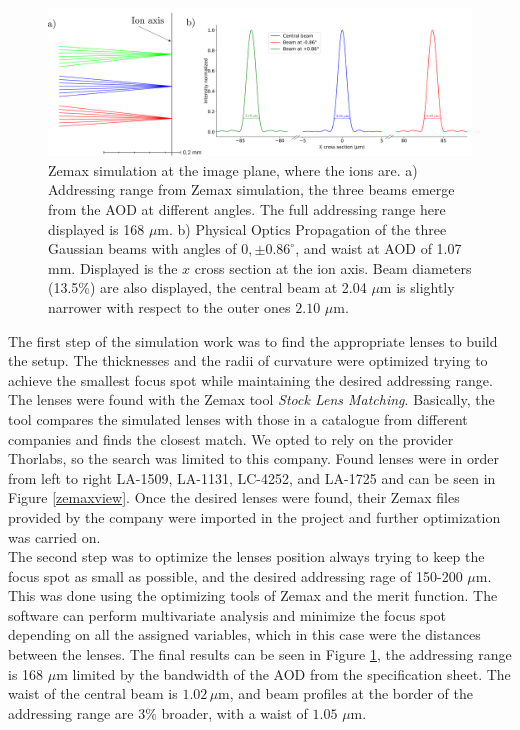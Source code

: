 \begin{figure}
     \centering
     \centering
     \includegraphics[width=1\textwidth]{img/range_plus_3beams}
     \caption{Zemax simulation at the image plane, where the ions are. a) Addressing range from Zemax simulation, the three beams emerge from the AOD at different angles. The full addressing range here displayed is 168 $\mu$m. b) Physical Optics Propagation of the three Gaussian beams with angles of $0,\pm0.86^\circ$, and waist at AOD of 1.07 mm. Displayed is the $x$ cross section at the ion axis. Beam diameters (13.5\%) are also displayed, the central beam at 2.04 $\mu$m is slightly narrower with respect to the outer ones $2.10$ $\mu$m.}
     \label{zemaxrange}
\end{figure}
The first step of the simulation work was to find the appropriate lenses to build the setup. The thicknesses and the radii of curvature were optimized trying to achieve the smallest focus spot while maintaining the desired addressing range. The lenses were found with the Zemax tool \emph{Stock Lens Matching}. Basically, the tool compares the simulated lenses with those in a catalogue from different companies and finds the closest match. We opted to rely on the provider Thorlabs, so the search was limited to this company. Found lenses were in order from left to right LA-1509, LA-1131, LC-4252, and LA-1725 and can be seen in Figure \ref{zemaxview}. Once the desired lenses were found, their Zemax files provided by the company were imported in the project and further optimization was carried on.\\
The second step was to optimize the lenses position always trying to keep the focus spot as small as possible, and the desired addressing rage of 150-200 $\mu$m. This was done using the optimizing tools of Zemax and the merit function. The software can perform multivariate analysis and minimize the focus spot depending on all the assigned variables, which in this case were the distances between the lenses. The final results can be seen in Figure \ref{zemaxrange}, the addressing range is 168 $\mu$m limited by the bandwidth of the AOD from the specification sheet. The waist of the central beam is $1.02\,\mu$m, and beam profiles at the border of the addressing range are $3\%$ broader, with a waist of $1.05$ $\mu$m.\\
